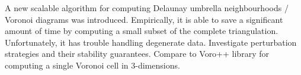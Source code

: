\bigskip \bigskip
A new scalable algorithm for computing Delaunay umbrella neighbourhoods /
Voronoi diagrams was introduced.
\medskip
Empirically, it is able to save a significant amount of time by computing
a small subset of the complete triangulation.
\medskip
Unfortunately, it has trouble handling degenerate data.
\vfil
{}
\bigskip \bigskip
Investigate perturbation strategies and their stability guarantees.
\medskip
Compare to {\verbatim Voro++} library for computing a single Voronoi cell
in $3$-dimensions.
\vfil\eject

\bye
